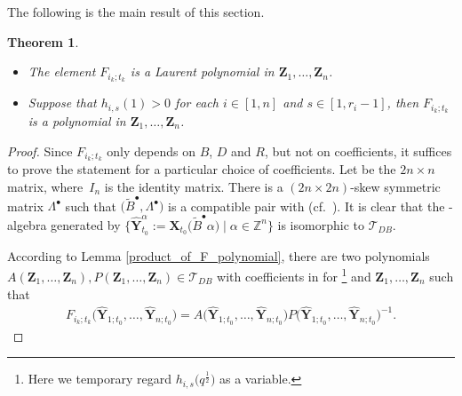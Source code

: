 \documentclass[10pt,a4paper]{amsart}
\numberwithin{equation}{section}
\newtheorem{Theorem}{Theorem}[section]
\begin{document}
The following is the main result of this section.
\begin{Theorem}\label{t:F-polynomial}\qquad
\begin{itemize}\itemsep=0pt
 \item[$(1)$] The element $F_{i_k;t_k}$ is a Laurent polynomial in $\mathbf{Z}_1,\dots, \mathbf{Z}_n$.
 \item[$(2)$] Suppose that $h_{i,s}(1)>0$ for each $i\in [1,n]$ and $s\in [1,r_i-1]$, then $F_{i_k;t_k}$ is a polynomial in $\mathbf{Z}_1,\dots, \mathbf{Z}_n$.
\end{itemize}

\end{Theorem}
\begin{proof}
 Since $F_{i_k;t_k}$ only depends on $B$, $D$ and $R$, but not on coefficients, it suffices to prove the statement for a particular choice of coefficients. Let  be the $2n\times n$ matrix, where~$I_n$ is the identity matrix. There is a $(2n\times 2n)$-skew symmetric matrix $\Lambda^{\bullet}$ such that $\bigl(\tilde{B}^{\bullet},\Lambda^{\bullet}\bigr)$ is a compatible pair with  (cf.\ \cite[Example 0.5]{Berenstein_Zelevinsky2005}). It is clear that the -algebra generated by $\bigl\{\mathbf{\hat{Y}}_{t_0}^{\alpha}:=\mathbf{X}_{t_{0}}\bigl(\tilde{B}^{\bullet}\alpha\bigr)\mid \alpha\in\mathbb{Z}^{n}\bigr\}$ is isomorphic to $\mathcal{T}_{DB}$.

 According to Lemma \ref{product_of_F_polynomial}, there are two polynomials $A(\mathbf{Z}_{1},\dots,\mathbf{Z}_{n}),P(\mathbf{Z}_{1},\dots,\mathbf{Z}_{n})\in \mathcal{T}_{DB}$ with coefficients in  for \footnote{Here we temporary regard $h_{i,s}\bigl(q^{\frac{1}{2}}\bigr)$ as a variable.} and $\mathbf{Z}_{1},\dots,\mathbf{Z}_{n}$ such that
 \begin{align}\label{fraction_of_F-polynomial}
 F_{i_{k};t_{k}}\bigl(\mathbf{\hat{Y}}_{1;t_{0}},\dots,\mathbf{\hat{Y}}_{n;t_{0}}\bigr)=A\bigl(\mathbf{\hat{Y}}_{1;t_{0}},\dots,\mathbf{\hat{Y}}_{n;t_{0}}\bigr)P\bigl(\mathbf{\hat{Y}}_{1;t_{0}},\dots,\mathbf{\hat{Y}}_{n;t_{0}}\bigr)^{-1}.
 \end{align}



\end{proof}
\end{document}

